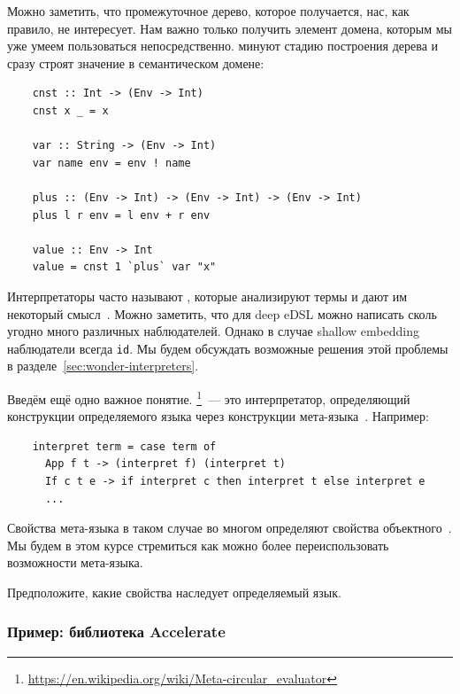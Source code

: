 Можно заметить, что промежуточное дерево, которое получается, нас, как правило, не интересует.
Нам важно только получить элемент домена, которым мы уже умеем пользоваться непосредственно.
 минуют стадию построения дерева и сразу строят значение в семантическом домене: %
\begin{verbatim}
    cnst :: Int -> (Env -> Int)
    cnst x _ = x

    var :: String -> (Env -> Int)
    var name env = env ! name

    plus :: (Env -> Int) -> (Env -> Int) -> (Env -> Int)
    plus l r env = l env + r env

    value :: Env -> Int
    value = cnst 1 `plus` var "x"
\end{verbatim}

Интерпретаторы часто называют , которые анализируют термы и дают им некоторый смысл~\cite{gibbons2013functional}.
Можно заметить, что для deep eDSL можно написать сколь угодно много различных наблюдателей.
Однако в случае shallow embedding наблюдатели всегда \texttt{id}.
Мы будем обсуждать возможные решения этой проблемы в разделе~\ref{sec:wonder-interpreters}.

Введём ещё одно важное понятие.
\footnote{\url{https://en.wikipedia.org/wiki/Meta-circular_evaluator}}~--- это интерпретатор, определяющий конструкции определяемого языка через конструкции мета-языка~\cite{reynolds1972definitional}.
Например:
\begin{verbatim}
    interpret term = case term of
      App f t -> (interpret f) (interpret t)
      If c t e -> if interpret c then interpret t else interpret e
      ...
\end{verbatim}

Свойства мета-языка в таком случае во многом определяют свойства объектного~\cite{reynolds1972definitional,reynolds1998definitional}.
Мы будем в этом курсе стремиться как можно более переиспользовать возможности мета-языка.

\begin{task}
    Предположите, какие свойства наследует определяемый язык.
\end{task}


\subsubsection{Пример: библиотека Accelerate}


